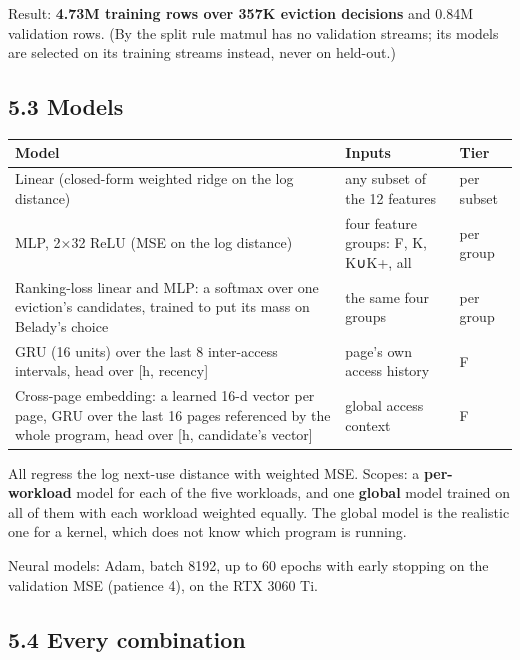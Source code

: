 \documentclass[10pt,a4paper]{article}
\begin{document}
Result: \textbf{4.73M training rows over 357K eviction decisions} and 0.84M validation rows. (By the split rule matmul has no validation streams; its models are selected on its training streams instead, never on held-out.)

\subsection*{5.3 Models}

\begin{center}\footnotesize
\begin{tabularx}{\linewidth}{XXl}
\toprule
\textbf{Model} & \textbf{Inputs} & \textbf{Tier} \\ \midrule
Linear (closed-form weighted ridge on the log distance) & any subset of the 12 features & per subset \\
MLP, 2×32 ReLU (MSE on the log distance) & four feature groups: F, K, K∪K+, all & per group \\
Ranking-loss linear and MLP: a softmax over one eviction's candidates, trained to put its mass on Belady's choice & the same four groups & per group \\
GRU (16 units) over the last 8 inter-access intervals, head over [h, recency] & page's own access history & F \\
Cross-page embedding: a learned 16-d vector per page, GRU over the last 16 pages referenced by the whole program, head over [h, candidate's vector] & global access context & F \\
\bottomrule
\end{tabularx}
\end{center}

All regress the log next-use distance with weighted MSE. Scopes: a \textbf{per-workload} model for each of the five workloads, and one \textbf{global} model trained on all of them with each workload weighted equally. The global model is the realistic one for a kernel, which does not know which program is running.

Neural models: Adam, batch 8192, up to 60 epochs with early stopping on the validation MSE (patience 4), on the RTX 3060 Ti.

\subsection*{5.4 Every combination}
\end{document}
